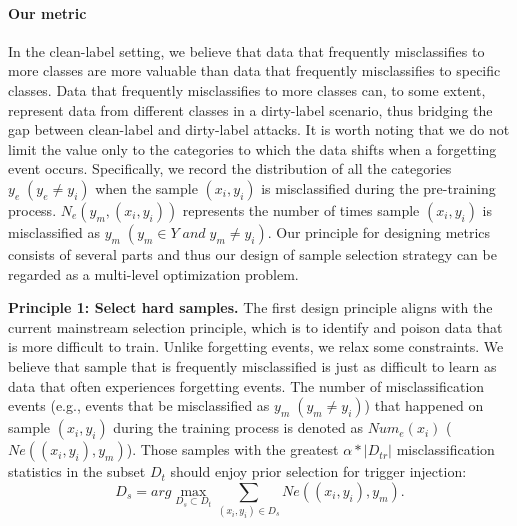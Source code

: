 \documentclass{article}
\begin{document}
\paragraph{Our metric}
In the clean-label setting, we believe that data that frequently misclassifies to more classes are more valuable than data that frequently misclassifies to specific classes. Data that frequently misclassifies to more classes can, to some extent, represent data from different classes in a dirty-label scenario, thus bridging the gap between clean-label and dirty-label attacks. It is worth noting that we do not limit the value only to the categories to which the data shifts when a forgetting event occurs. Specifically, we record the distribution of all the categories \(y_e\;(y_e \neq y_i)\) when the sample \((x_i,y_i)\) is misclassified during the pre-training process. \(N_e(y_m,(x_i,y_i))\) represents the number of times sample \((x_i,y_i)\) is misclassified as \(y_m\;(y_m\in Y\;and\;y_m\neq y_i )\). Our principle for designing metrics consists of several parts and thus our design of sample selection strategy can be regarded as a multi-level optimization problem.

\textbf{Principle 1: Select hard samples.} The first design principle aligns with the current mainstream selection principle, which is to identify and poison data that is more difficult to train. Unlike forgetting events, we relax some constraints. We believe that sample that is frequently misclassified is just as difficult to learn as data that often experiences forgetting events. The number of misclassification events (e.g., events that be misclassified as \(y_m\;(y_m \neq y_i)\)) that happened on sample \((x_i,y_i)\) during the training process is denoted as \(Num_{e}(x_i)\) (\(N{e}((x_i,y_i),y_m)\)). Those samples with the greatest \(\alpha*|D_{tr}|\) misclassification statistics in the subset \(D_t\) should enjoy prior selection for trigger injection:
\begin{equation}
D_s = arg \max_{D_s\subset D_t}\sum_{(x_i,y_i) \in D_s}N{e}((x_i,y_i),y_m).
\end{equation}
\end{document}

